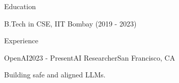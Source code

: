 \documentclass{resume}
\begin{document}
\begin{rSection}{Education}
  \item B.Tech in CSE, IIT Bombay (2019 - 2023)
\end{rSection}

\begin{rSection}{Experience}
  \begin{rSubsection}{OpenAI}{2023 - Present}{AI Researcher}{San Francisco, CA}
    \item Building safe and aligned LLMs.
  \end{rSubsection}
\end{rSection}
\end{document}
